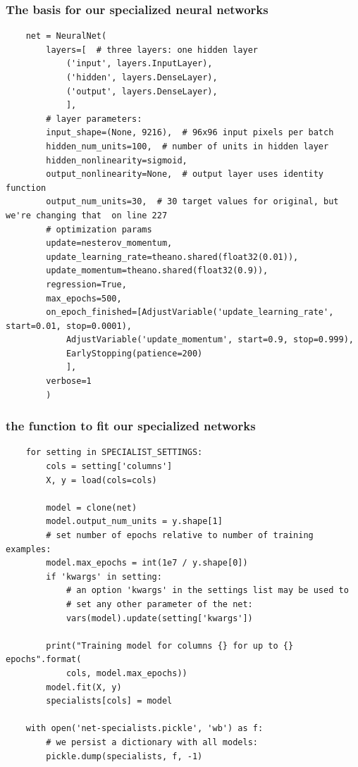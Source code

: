 \documentclass{beamer}
\begin{document}
\begin{frame}[fragile]
\frametitle{The basis for our specialized neural networks}
\begin{verbatim}
    net = NeuralNet(
        layers=[  # three layers: one hidden layer
            ('input', layers.InputLayer),
            ('hidden', layers.DenseLayer),
            ('output', layers.DenseLayer),
            ],
        # layer parameters:
        input_shape=(None, 9216),  # 96x96 input pixels per batch
        hidden_num_units=100,  # number of units in hidden layer
        hidden_nonlinearity=sigmoid,
        output_nonlinearity=None,  # output layer uses identity function
        output_num_units=30,  # 30 target values for original, but we're changing that  on line 227
        # optimization params
        update=nesterov_momentum,
        update_learning_rate=theano.shared(float32(0.01)),
        update_momentum=theano.shared(float32(0.9)),
        regression=True, 
        max_epochs=500,
        on_epoch_finished=[AdjustVariable('update_learning_rate', start=0.01, stop=0.0001),
            AdjustVariable('update_momentum', start=0.9, stop=0.999),
            EarlyStopping(patience=200)
            ],
        verbose=1
        )
\end{verbatim}
\end{frame}

\begin{frame}[fragile]
\frametitle{the function to fit our specialized networks}
\begin{verbatim}
    for setting in SPECIALIST_SETTINGS:
        cols = setting['columns']
        X, y = load(cols=cols)

        model = clone(net)
        model.output_num_units = y.shape[1]
        # set number of epochs relative to number of training examples:
        model.max_epochs = int(1e7 / y.shape[0])
        if 'kwargs' in setting:
            # an option 'kwargs' in the settings list may be used to
            # set any other parameter of the net:
            vars(model).update(setting['kwargs'])

        print("Training model for columns {} for up to {} epochs".format(
            cols, model.max_epochs))
        model.fit(X, y)
        specialists[cols] = model

    with open('net-specialists.pickle', 'wb') as f:
        # we persist a dictionary with all models:
        pickle.dump(specialists, f, -1)
\end{verbatim}
\end{frame}
\end{document}
